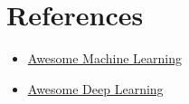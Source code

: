 \documentclass[11pt,a4paper,oneside]{book}
\begin{document}
\chapter{References}
\begin{itemize}
  \item \href{https://github.com/josephmisiti/awesome-machine-learning}{Awesome Machine Learning}
  \item \href{https://github.com/ChristosChristofidis/awesome-deep-learning}{Awesome Deep Learning}
\end{itemize}
\end{document}
